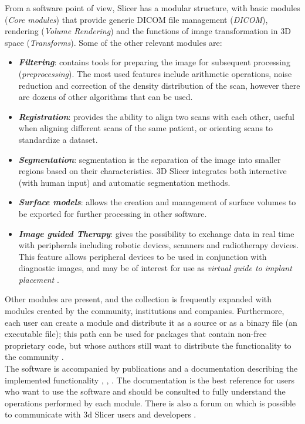 From a software point of view, Slicer has a modular structure, with basic modules (\emph{Core modules}) that provide generic DICOM file management (\emph{DICOM}), rendering (\emph{Volume Rendering}) and the functions of image transformation in 3D space (\emph{Transforms}). Some of the other relevant modules are:
\begin{itemize}
\item \emph{\textbf{Filtering}}: contains tools for preparing the image for subsequent processing (\emph{preprocessing}). The most used features include arithmetic operations, noise reduction and correction of the density distribution of the scan, however there are dozens of other algorithms that can be used.
\item \emph{\textbf{Registration}}: provides the ability to align two scans with each other, useful when aligning different scans of the same patient, or orienting scans to standardize a dataset.
\item \emph{\textbf{Segmentation}}: segmentation is the separation of the image into smaller regions based on their characteristics. 3D Slicer integrates both interactive (with human input) and automatic segmentation methods.
\item \emph{\textbf{Surface models}}: allows the creation and management of surface volumes to be exported for further processing in other software.
\item \emph{\textbf{Image guided Therapy}}: gives the possibility to exchange data in real time with peripherals including robotic devices, scanners and radiotherapy devices.
This feature allows peripheral devices to be used in conjunction with diagnostic images, and may be of interest for use as \emph{virtual guide to implant placement} \parencite{Reference118}.
\end{itemize}

Other modules are present, and the collection is frequently expanded with modules created by the community, institutions and companies. Furthermore, each user can create a module and distribute it as a source or as a binary file (an executable file); this path can be used for packages that contain non-free proprietary code, but whose authors still want to distribute the functionality to the community \parencite{Reference28}. \\
The software is accompanied by publications and a documentation describing the implemented functionality \parencite{Reference28}, \parencite{Reference29}, \parencite{Reference30}. The documentation is the best reference for users who want to use the software and should be consulted to fully understand the operations performed by each module. There is also a forum on which is possible to communicate with 3d Slicer users and developers \parencite{Reference35}.

